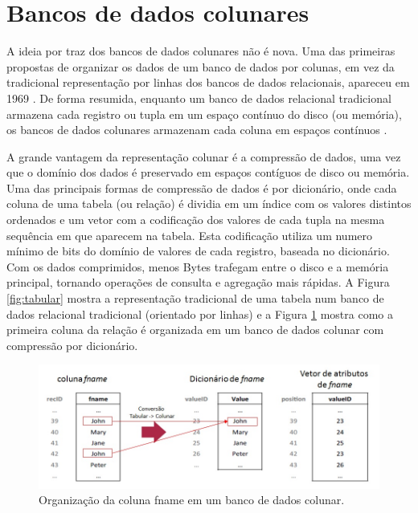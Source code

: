 \section{Bancos de dados colunares} 
\label{sec:colunar}

A ideia por traz dos bancos de dados colunares não é nova. Uma das primeiras propostas de organizar os 
dados de um banco de dados por colunas, em vez da tradicional representação por linhas dos bancos de 
dados relacionais, apareceu em 1969 \citep{estabrook1969theory}. De forma resumida, enquanto um banco de 
dados relacional tradicional armazena cada registro ou tupla em um espaço contínuo do disco (ou memória), 
os bancos de dados colunares armazenam cada coluna em espaços contínuos \citep{Abadi2009}. 

A grande vantagem da representação colunar é a compressão de dados, uma vez que o domínio dos dados 
é preservado em espaços contíguos de disco ou memória. 
Uma das principais formas de compressão de dados é por dicionário, onde cada coluna de uma 
tabela (ou relação) é dividia em um índice com os valores distintos ordenados e um vetor com a 
codificação dos valores de cada tupla na mesma sequência em que aparecem na tabela. 
Esta codificação utiliza um numero mínimo de bits do domínio de valores de cada registro, 
baseada no dicionário. Com os dados comprimidos, menos Bytes trafegam entre o disco e a 
memória principal, tornando operações de consulta e agregação mais rápidas.
A Figura \ref{fig:tabular} mostra a representação tradicional de uma tabela num banco de dados 
relacional tradicional (orientado por linhas) e a Figura \ref{fig:colunar} mostra como a 
primeira coluna da relação é organizada em um banco de dados colunar com compressão por dicionário.

\begin{figure}[!htbp]
	\centering
	\includegraphics[width=\linewidth]{./Representacao_colunar.jpg}
	\caption{Organização da coluna fname em um banco de dados colunar.}
	\label{fig:colunar}
\end{figure}


